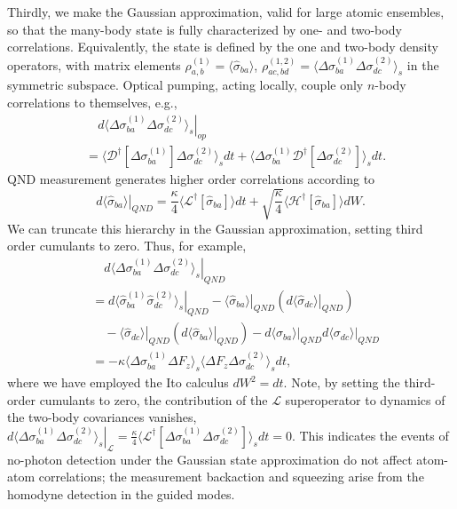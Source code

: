 \documentclass[aps,pra,twocolumn,superscriptaddress]{revtex4-1} %
\newcommand{\nn}{\nonumber}
\newcommand{\expect}[1]{\big\langle #1 \big\rangle}
\begin{document}
Thirdly, we make the Gaussian approximation, valid for large atomic ensembles, so that the many-body state is fully characterized by one- and two-body correlations. Equivalently, the state is defined by the one and two-body density operators, with matrix elements $\rho^{(1)}_{a, b} =\expect{\hat{\sigma}_{ba}}$, $\rho^{(1,2)}_{ac,bd}=\expect{\Delta \sigma_{ba}^{(1)}\Delta\sigma_{dc}^{(2)} }_s$ in the symmetric subspace.   Optical pumping, acting locally, couple only $n$-body correlations to themselves, e.g.,
\begin{align}
&\quad\left.d\expect{\!\Delta \sigma_{ba}^{(1)}\Delta\sigma_{dc}^{(2)} }_s\right|_{op} \nn\\
&= \expect{\mathcal{D}^\dagger[\Delta \sigma_{ba}^{(1)}]\Delta\sigma_{dc}^{(2)} }_sdt + \expect{\Delta \sigma_{ba}^{(1)} \mathcal{D}^\dagger[\Delta\sigma_{dc}^{(2)}] }_sdt .\label{eq:dsigmabadc_op}
\end{align}
QND measurement generates higher order correlations according to
\begin{equation}\label{eq:dsigmaba_QND}
\left.d\expect{\hat{\sigma}_{ba}}\right|_{QND} =\frac{\kappa}{4}\expect{\mathcal{L}^\dagger\left[\hat{\sigma}_{ba} \right]}dt + \sqrt{\frac{\kappa}{4}}\expect{\mathcal{H}^\dagger\left[\hat{\sigma}_{ba} \right]}dW .
\end{equation}
We can truncate this hierarchy in the Gaussian approximation, setting third order cumulants to zero.  Thus, for example,
\begin{align}
&\quad\left.d\expect{\Delta \sigma_{ba}^{(1)} \Delta \sigma_{dc}^{(2)}}_s \right|_{QND}\nn\\
&= \left.d\expect{\hat{\sigma}_{ba}^{(1)} \hat{\sigma}_{dc}^{(2)}}_s \right|_{QND} - \left. \expect{\hat{\sigma}_{ba}} \right|_{QND} \left( \left.d\expect{\hat{\sigma}_{dc}} \right|_{QND}\right) \nonumber\\
&\quad -\! \left. \expect{\!\hat{\sigma}_{dc}\!}\! \right|_{QN\!D} \left(\! \left.d\expect{\!\hat{\sigma}_{ba}\!} \!\right|_{QN\!D}\!\right)
\!-\! \left.d\expect{\!\sigma_{ba}\!} \!\right|_{QN\!D}\left.d\expect{\sigma_{dc}} \right|_{QN\!D} \nonumber \\
&= -\kappa\expect{\Delta \sigma^{(1)}_{ba}  \Delta F_z }_s \expect{\Delta F_z \Delta \sigma_{dc}^{(2)} }_sdt,\label{eq:dsigmabadc_QND}
\end{align}
where we have employed the Ito calculus $dW^2 = dt$.
Note, by setting the third-order cumulants to zero,  the contribution of the $\mathcal{L}$ superoperator to dynamics of the two-body covariances vanishes,  $ \left.d\expect{\Delta \sigma_{ba}^{(1)} \Delta \sigma_{dc}^{(2)}}_s\right|_\mathcal{L} =\frac{\kappa}{4}\expect{\mathcal{L}^\dagger\left[\Delta\sigma_{ba}^{(1)}\Delta\sigma_{dc}^{(2)} \right]}_sdt=0 $.  This indicates the events of no-photon detection under the Gaussian state approximation do not affect atom-atom correlations;  the measurement backaction and squeezing arise from the homodyne detection in the guided modes.
\end{document}
